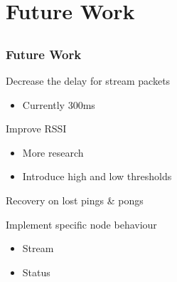 \section{Future Work}
\subsection*{}


\begin{frame}[t]
  \frametitle{Future Work}
  Decrease the delay for stream packets
  \begin{itemize}
  \item Currently 300ms
  \end{itemize}
  
  \vfill
  
  Improve RSSI
  \begin{itemize}
    \item More research
    \item Introduce high and low thresholds
  \end{itemize}

  \vfill

  Recovery on lost pings \& pongs
  
  \vfill
  
  Implement specific node behaviour
  \begin{itemize}
    \item Stream
    \item Status
  \end{itemize}

\end{frame}
